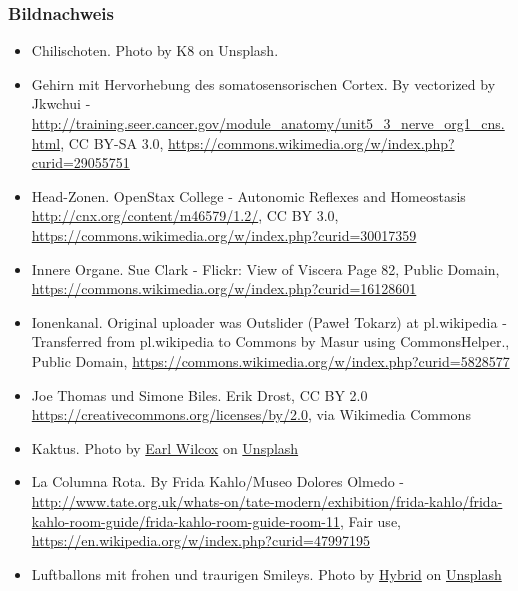 \documentclass{beamer}
\begin{document}
\begin{frame}
 
\frametitle{Bildnachweis}
 
\begin{tiny}
  

\begin{itemize}

\item
Chilischoten. Photo by K8 on Unsplash. 

\item
Gehirn mit Hervorhebung des somatosensorischen Cortex. By vectorized by Jkwchui - \url{http://training.seer.cancer.gov/module_anatomy/unit5_3_nerve_org1_cns.html}, CC BY-SA 3.0, \url{https://commons.wikimedia.org/w/index.php?curid=29055751}

\item
Head-Zonen. OpenStax College - Autonomic Reflexes and Homeostasis  \url{http://cnx.org/content/m46579/1.2/}, CC BY 3.0, \url{https://commons.wikimedia.org/w/index.php?curid=30017359}

\item
Innere Organe.  Sue Clark - Flickr: View of Viscera Page 82, Public Domain, \url{https://commons.wikimedia.org/w/index.php?curid=16128601}

\item
Ionenkanal.  Original uploader was Outslider (Paweł Tokarz) at pl.wikipedia - Transferred from pl.wikipedia to Commons by Masur using CommonsHelper., Public Domain, \url{https://commons.wikimedia.org/w/index.php?curid=5828577}
\item
Joe Thomas und Simone Biles. Erik Drost, CC BY 2.0 \url{https://creativecommons.org/licenses/by/2.0}, via Wikimedia Commons

\item
Kaktus. Photo by \href{https://unsplash.com/@earl_plannerzone?utm_source=unsplash&utm_medium=referral&utm_content=creditCopyText}{Earl Wilcox} on \href{https://unsplash.com/s/photos/pain?utm_source=unsplash&utm_medium=referral&utm_content=creditCopyText}{Unsplash}

\item
La Columna Rota. By Frida Kahlo/Museo Dolores Olmedo - \url{http://www.tate.org.uk/whats-on/tate-modern/exhibition/frida-kahlo/frida-kahlo-room-guide/frida-kahlo-room-guide-room-11}, Fair use, \url{https://en.wikipedia.org/w/index.php?curid=47997195}


\item
Luftballons mit frohen und traurigen Smileys. Photo by \href{https://unsplash.com/@artbyhybrid?utm_source=unsplash&utm_medium=referral&utm_content=creditCopyText}{Hybrid} on \href{https://unsplash.com/s/photos/feedback?utm_source=unsplash&utm_medium=referral&utm_content=creditCopyText}{Unsplash}


\end{itemize}
\end{tiny}
\end{frame}
\end{document}
